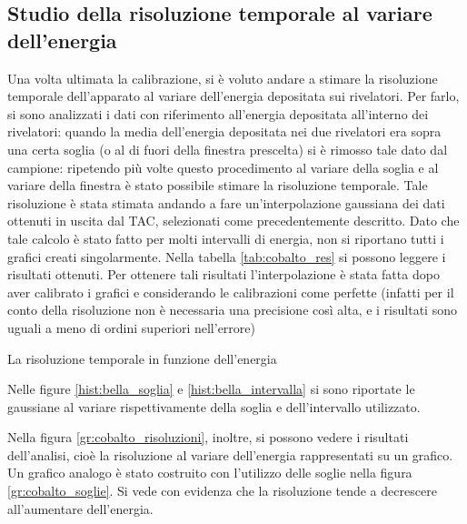 \subsection{Studio della risoluzione temporale al variare dell'energia}

Una volta ultimata la calibrazione, si è voluto andare a stimare la risoluzione temporale dell'apparato al variare dell'energia depositata sui
rivelatori. Per farlo, si sono analizzati i dati con riferimento all'energia depositata all'interno dei rivelatori: quando la media dell'energia
depositata nei due rivelatori era sopra una certa soglia (o al di fuori della finestra prescelta) si è rimosso tale dato dal campione: ripetendo più
volte questo procedimento al variare della soglia e al variare della finestra è stato possibile stimare la risoluzione temporale. Tale
risoluzione è stata stimata andando a fare un'interpolazione gaussiana dei dati ottenuti in uscita dal TAC, selezionati come precedentemente descritto.
Dato che tale calcolo è stato fatto per molti intervalli di energia, non si riportano tutti i grafici creati singolarmente.
Nella tabella \ref{tab:cobalto_res} si possono leggere i risultati ottenuti. Per ottenere tali risultati l'interpolazione è stata fatta dopo aver calibrato i grafici e
considerando le calibrazioni come perfette (infatti per il conto della risoluzione non è necessaria una precisione così alta, e i risultati sono uguali a meno di ordini
superiori nell'errore)\\

%
\begin{table}
	\centering
	
	\caption{La risoluzione temporale in funzione dell'energia}
	\label{tab:cobalto_res}
\end{table}
%
Nelle figure \ref{hist:bella_soglia} e \ref{hist:bella_intervalla} si sono riportate le gaussiane al variare rispettivamente della soglia e dell'intervallo utilizzato.


Nella figura \ref{gr:cobalto_risoluzioni}, inoltre, si possono vedere i risultati dell'analisi, cioè la risoluzione al variare dell'energia rappresentati su un grafico.
Un grafico analogo è stato costruito con l'utilizzo delle soglie nella figura \ref{gr:cobalto_soglie}. Si
vede con evidenza che la risoluzione tende a decrescere all'aumentare dell'energia.
\\
\\


